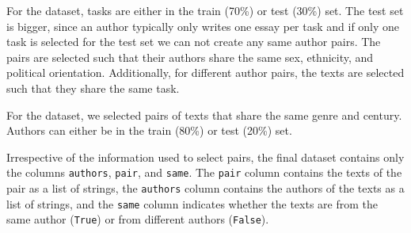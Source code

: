 For the \dataStudent{} dataset,
tasks are either in the train (70\%) or test (30\%) set.
The test set is bigger, since an author typically only writes one essay per task and if only one task is selected for the test set we can not create any same author pairs.
The pairs are selected such that their authors share the same sex, ethnicity, and political orientation.
Additionally, for different author pairs, the texts are selected such that they share the same task.

For the \dataGutenberg{} dataset,
we selected pairs of texts that share the same genre and century.
Authors can either be in the train (80\%) or test (20\%) set.

Irrespective of the information used to select pairs, the final dataset contains only the columns \texttt{authors}, \texttt{pair}, and \texttt{same}.
The \texttt{pair} column contains the texts of the pair as a list of strings,
the \texttt{authors} column contains the authors of the texts as a list of strings,
and the \texttt{same} column indicates whether the texts are from the same author (\texttt{True}) or from different authors (\texttt{False}).
